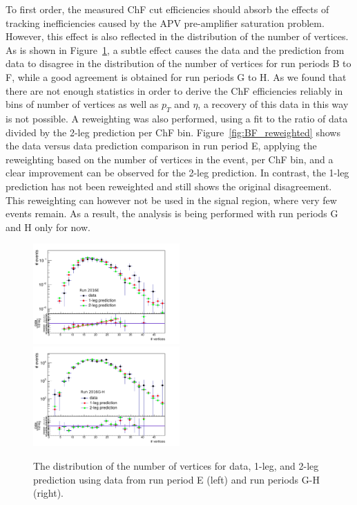 To first order, the measured ChF cut efficiencies should absorb the effects of tracking inefficiencies caused by the APV pre-amplifier saturation problem. However, this effect is also reflected in the distribution of the number of vertices. As is shown in Figure~\ref{fig:nvtx_reweighting}, a subtle effect causes the data and the prediction from data to disagree in the distribution of the number of vertices for run periods B to F, while a good agreement is obtained for run periods G to H. As we found that there are not enough statistics in order to derive the ChF efficiencies reliably in bins of number of vertices as well as $p_T$ and $\eta$, a recovery of this data in this way is not possible. A reweighting was also performed, using a fit to the ratio of data divided by the 2-leg prediction per ChF bin. Figure~\ref{fig:BF_reweighted} shows the data versus data prediction comparison in run period E, applying the reweighting based on the number of vertices in the event, per ChF bin, and a clear improvement can be observed for the 2-leg prediction. In contrast, the 1-leg prediction has not been reweighted and still shows the original disagreement. This reweighting can however not be used in the signal region, where very few events remain. As a result, the analysis is being performed with run periods G and H only for now.

\begin{figure}[h]
  \centering
  \includegraphics[width=0.5\textwidth]{figures/Data_distributions_excl_RunE_ChF0p25To0p3_nvtx.pdf}\hfill%
  \includegraphics[width=0.5\textwidth]{figures/RunGH_ChF0p25To0p3_nvtx.pdf}
  \caption{The distribution of the number of vertices for data, 1-leg, and 2-leg prediction using data from run period E (left) and run periods G-H (right).}
  \label{fig:nvtx_reweighting}
\end{figure}

